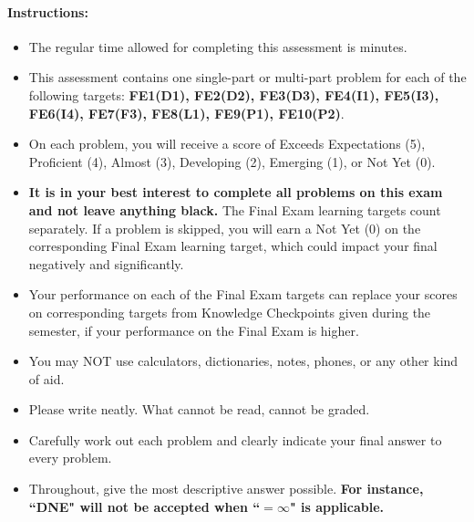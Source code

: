 \documentclass[11pt]{article}
\begin{document}
{%

\paragraph*{Instructions:}

\begin{itemize}
    
    \item The regular time allowed for completing this assessment is  minutes.
    \item This assessment contains one single-part or multi-part problem for each of the following targets: \textbf{FE1(D1), FE2(D2), FE3(D3), FE4(I1), FE5(I3), FE6(I4), FE7(F3), FE8(L1), FE9(P1), FE10(P2)}.
    \item On each problem, you will receive a score of Exceeds Expectations (5), Proficient (4), Almost (3), Developing (2), Emerging (1), or Not Yet (0). %
    \item \textbf{It is in your best interest to complete all problems on this exam and not leave anything black.} The Final Exam learning targets count separately. If a problem is skipped, you will earn a Not Yet (0) on the corresponding Final Exam learning target, which could impact your final negatively and significantly.
    \item Your performance on each of the Final Exam targets can replace your scores on corresponding targets from Knowledge Checkpoints given during the semester, if your performance on the Final Exam is higher.
    \item You may NOT use calculators, dictionaries, notes, phones, or any other kind of aid.
    \item Please write neatly. What cannot be read, cannot be graded.
    \item Carefully work out each problem and clearly indicate your final answer to every problem.
    \item Throughout, give the most descriptive answer possible. \textbf{For instance, ``DNE" will not be accepted when ``$=\infty$" is applicable.}

\end{itemize}}
\end{document}
